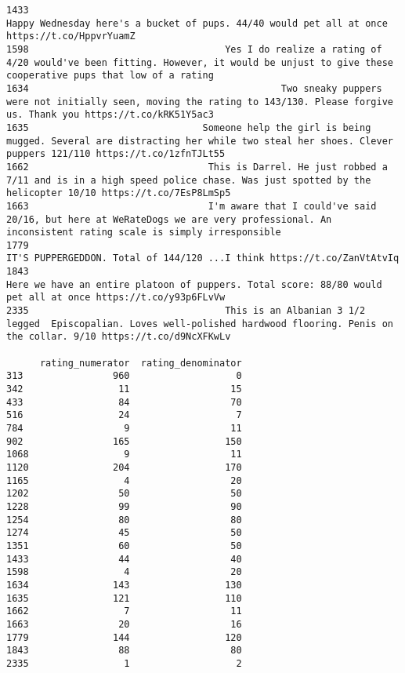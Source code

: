 \documentclass[11pt]{article}
\begin{document}
\begin{verbatim}
1433                                                                               Happy Wednesday here's a bucket of pups. 44/40 would pet all at once https://t.co/HppvrYuamZ   
1598                                   Yes I do realize a rating of 4/20 would've been fitting. However, it would be unjust to give these cooperative pups that low of a rating   
1634                                             Two sneaky puppers were not initially seen, moving the rating to 143/130. Please forgive us. Thank you https://t.co/kRK51Y5ac3   
1635                               Someone help the girl is being mugged. Several are distracting her while two steal her shoes. Clever puppers 121/110 https://t.co/1zfnTJLt55   
1662                                This is Darrel. He just robbed a 7/11 and is in a high speed police chase. Was just spotted by the helicopter 10/10 https://t.co/7EsP8LmSp5   
1663                                I'm aware that I could've said 20/16, but here at WeRateDogs we are very professional. An inconsistent rating scale is simply irresponsible   
1779                                                                                                     IT'S PUPPERGEDDON. Total of 144/120 ...I think https://t.co/ZanVtAtvIq   
1843                                                                Here we have an entire platoon of puppers. Total score: 88/80 would pet all at once https://t.co/y93p6FLvVw   
2335                                   This is an Albanian 3 1/2 legged  Episcopalian. Loves well-polished hardwood flooring. Penis on the collar. 9/10 https://t.co/d9NcXFKwLv   

      rating_numerator  rating_denominator  
313                960                   0  
342                 11                  15  
433                 84                  70  
516                 24                   7  
784                  9                  11  
902                165                 150  
1068                 9                  11  
1120               204                 170  
1165                 4                  20  
1202                50                  50  
1228                99                  90  
1254                80                  80  
1274                45                  50  
1351                60                  50  
1433                44                  40  
1598                 4                  20  
1634               143                 130  
1635               121                 110  
1662                 7                  11  
1663                20                  16  
1779               144                 120  
1843                88                  80  
2335                 1                   2  
    \end{verbatim}
\end{document}
